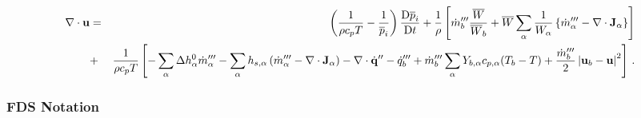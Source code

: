 \begin{eqnarray}
\label{eqn_divconstraint_final}
\Div\mathbf{u}  &=& \left(\frac{1}{\rho c_p T}  -  \frac{1}{\overline{p}_i}\right) \frac{\mbox{D}\overline{p}_i}{\mbox{D} t} + \frac{1}{\rho} \left[ \dot{m}_b^{\tripleprime} \frac{\overline{W}}{\overline{W}_b} +  \overline{W}\sum_\alpha \frac{1}{W_\alpha} \left\{  \dot{m}_\alpha^{\tripleprime}
- \Div\mathbf{J}_{\alpha} \right\} \right] \nonumber \vspace{0.3cm}\\
&+&  \frac{1}{\rho c_p T} \left[ - \sum_\alpha \Delta h^0_\alpha \dot{m}_\alpha^{\tripleprime} - \sum_\alpha h_{s,\alpha}\left(  \dot{m}_\alpha^{\tripleprime} - \Div \mathbf{J}_{\alpha} \right) - \Div \dot{\mathbf{q}}^{\prime\prime} -\dq_b''' + \dot{m}_{b}^{\tripleprime} \sum_\alpha Y_{b,\alpha} c_{p,\alpha}(T_b-T) + \frac{\dot{m}_{b}^{\tripleprime}}{2}\left|\mathbf{u}_b-\mathbf{u}\right|^2 \right] \,\mbox{.} \nonumber \vspace{0.3cm}\\
\end{eqnarray}


\subsubsection{FDS Notation}
\label{fds_notation}

